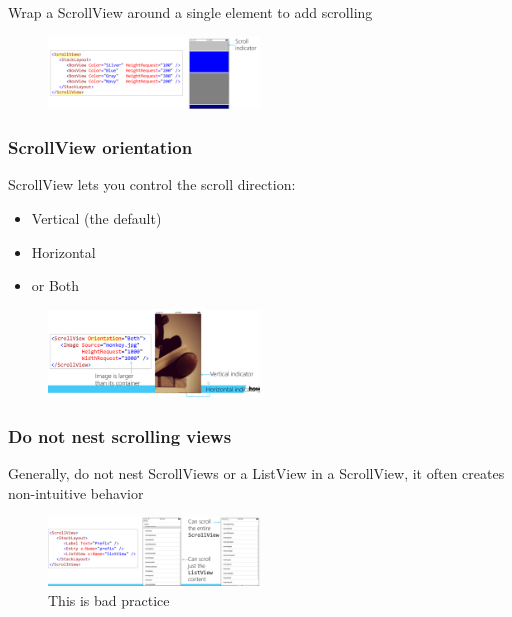 \documentclass{article}
\begin{document}
Wrap a ScrollView around a single element to add scrolling

\begin{figure}[H]
    \centering
    \includegraphics[width=0.5\textwidth]{xaml-scrollview.png}
    \caption{}
\end{figure}

\subsubsection{ScrollView orientation}

ScrollView lets you control the scroll direction: 

\begin{itemize}
    \item Vertical (the default)
    \item Horizontal
    \item or Both
\end{itemize}


\begin{figure}[H]
    \centering
    \includegraphics[width=0.5\textwidth]{xaml-scrollview-orientation.png}
    \caption{}
\end{figure}


\subsubsection{Do not nest scrolling views}

Generally, do not nest ScrollViews or a ListView in a ScrollView, it often
creates non-intuitive behavior

\begin{figure}[H]
    \centering
    \includegraphics[width=0.5\textwidth]{xaml-scrollview-nest.png}
    \caption{This is bad practice}
\end{figure}
\end{document}

